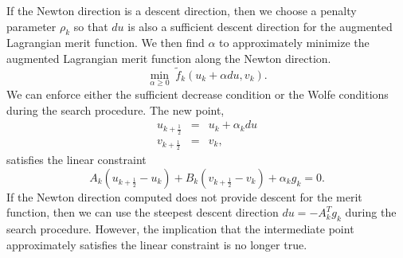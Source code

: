 \documentclass[]{book}
\begin{document}
If the Newton direction is a descent direction, then we choose a 
penalty parameter $\rho_k$ so that $du$ is also a sufficient descent 
direction for the augmented Lagrangian merit function.  We 
then find $\alpha$ to approximately minimize the augmented 
Lagrangian merit function along the Newton direction.
\[
\displaystyle \min_{\alpha \geq 0} \; \tilde{f}_k(u_k + \alpha du, v_k).
\]
We can enforce either the sufficient decrease condition or the 
Wolfe conditions during the search procedure.  The new point, 
\[
\begin{array}{lcl}
u_{k+\frac{1}{2}} & = & u_k + \alpha_k du \\
v_{k+\frac{1}{2}} & = & v_k,
\end{array}
\]
satisfies the linear constraint
\[
A_k (u_{k+\frac{1}{2}} - u_k) + B_k (v_{k+\frac{1}{2}} - v_k) + \alpha_k g_k = 0.
\]
If the Newton direction computed does not provide descent for the merit 
function, then we can use the steepest descent direction $du = -A_k^T g_k$ 
during the search procedure.  However, the implication that the intermediate
point approximately satisfies the linear constraint is no longer true.
\end{document}
